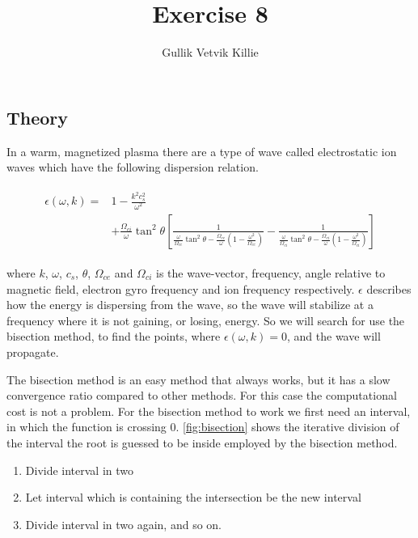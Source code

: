 \documentclass[x11names]{article}
\title{ Exercise 8}
\author{Gullik Vetvik Killie
		}
\begin{document}
\maketitle

\section{}

\subsection{Theory}
  In a warm, magnetized plasma there are a type of wave called electrostatic ion waves which have the following dispersion relation.

  \begin{align}
    \begin{split}
      \epsilon(\omega,k) = &1- \frac{k^2c_s^2}{\omega^2} 
      \\
      & + \frac{\Omega_{ci}}{\omega}\tan^2\theta \left[  \frac{1}{ \frac{\omega}{\Omega_{ce}}\tan^2 \theta - \frac{\Omega_{ce}}{\omega} \left( 1 - \frac{\omega^2}{\Omega_{ce}} \right) }  
                                                        -\frac{1}{ \frac{\omega}{\Omega_{ci}}\tan^2 \theta - \frac{\Omega_{ci}}{\omega} \left( 1 - \frac{\omega^2}{\Omega_{ci}} \right) } \right]
    \end{split}
    \label{eq:dispersion_relation}
  \end{align}

  where \(k\), \(\omega\), \(c_s\), \(\theta\), \(\Omega_{ce}\) and \(\Omega_{ci}\) is the wave-vector, frequency, angle relative to magnetic field, electron gyro frequency and ion frequency respectively. \(\epsilon\) describes how the energy is dispersing from the wave, so the wave will stabilize at a frequency where it is not gaining, or losing, energy. So we will search for use the bisection method, to find the points, where \(\epsilon(\omega,k) = 0\), and the wave will propagate.

  The bisection method is an easy method that always works, but it has a slow convergence ratio compared to other methods. For this case the computational cost is not a problem. For the bisection method to work we first need an interval, in which the function is crossing \(0\). \cref{fig:bisection} shows the iterative division of the interval the root is guessed to be inside employed by the bisection method.
  \begin{enumerate}
    \item Divide interval in two
    \item Let interval which is containing the intersection be the new interval
    \item Divide interval in two again, and so on.
  \end{enumerate}
\end{document}
